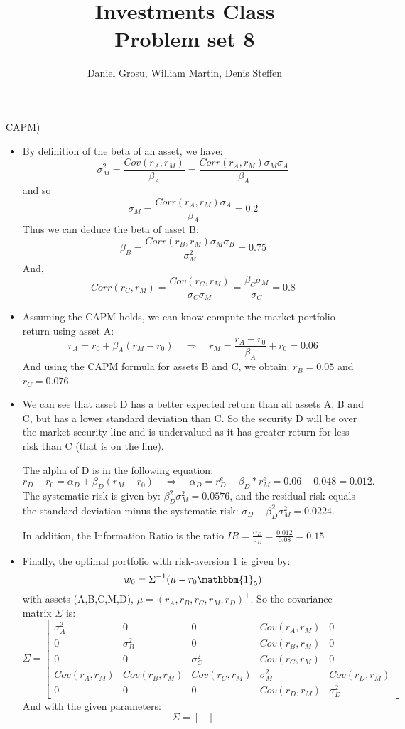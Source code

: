 \documentclass[10pt]{article}
\newenvironment{exercise}[2][Exercise]{\begin{trivlist}
  \item[\hskip \labelsep {\bfseries #1}\hskip \labelsep {\bfseries #2.}]}{\end{trivlist}}
\begin{document}
  \pagecolor{solar}
	
  \renewcommand{\qedsymbol}{\smiley}
	\title{Investments Class \\ Problem set 8}
	\author{Daniel Grosu, William Martin, Denis Steffen}
		
\maketitle

\begin{exercise}{1}(CAPM)
\end{exercise}
\begin{itemize}
  \item[(a)] By definition of the beta of an asset, we have: $$ \sigma_M^2 = \frac{Cov(r_A,r_M)}{\beta_A} = \frac{Corr(r_A,r_M)\sigma_M\sigma_A}{\beta_A}$$ and so $$ \sigma_M = \frac{Corr(r_A,r_M)\sigma_A}{\beta_A} = 0.2$$
  Thus we can deduce the beta of asset B: $$\beta_B = \frac{Corr(r_B,r_M)\sigma_M\sigma_B}{\sigma_M^2} = 0.75$$
  And, 
  $$Corr(r_C,r_M) = \frac{Cov(r_C,r_M)}{\sigma_C\sigma_M} = \frac{\beta_C\sigma_M}{\sigma_C}  = 0.8$$
  \item[(b)] Assuming the CAPM holds, we can know compute the market portfolio return using asset A: 
  $$ r_A = r_0 + \beta_A(r_M-r_0) \quad \Rightarrow \quad r_M = \frac{r_A-r_0}{\beta_A} + r_0 = 0.06$$ 
  And using the CAPM formula for assets B and C, we obtain: $ r_B = 0.05$ and $r_C = 0.076$.
  \item[(c)] We can see that asset D has a better expected return than all assets A, B and C, but has a lower standard deviation than C. So the security D will be over the market security line and is undervalued as it has greater return for less risk than C (that is on the line). 
  
  The alpha of D is in the following equation: 
  $$ r_D - r_0 = \alpha_D + \beta_D(r_M-r_0) \quad \Rightarrow \quad \alpha_D = r_D^e -\beta_D*r_M^e = 0.06 - 0.048 = 0.012.$$ 
  The systematic risk is given by: $\beta_D^2\sigma_M^2 = 0.0576$, and the residual risk equals the standard deviation minus the systematic risk: $\sigma_D-\beta_D^2\sigma_M^2 = 0.0224.$

  In addition, the Information Ratio is the ratio $IR = \frac{\alpha_D}{\sigma_D} =\frac{0.012}{0.08}= 0.15$
  \item[(d)] Finally, the optimal portfolio with risk-aversion $1$ is given by:
  $$ w_0 = \Sigma^{-1}(\mu-r_0\mathbbm{1}_5)$$ with assets (A,B,C,M,D), $\mu = (r_A,r_B,r_C,r_M,r_D)^\top$. So the covariance matrix $\Sigma$ is: 
  $$ \Sigma = \left[\begin{array}{ccccc}
    \sigma_A^2& 0 &0 &Cov(r_A,r_M)& 0\\
    0&\sigma_B^2 & 0 & Cov(r_B,r_M)&0 \\
    0&0&\sigma_C^2&Cov(r_C,r_M)&0\\
    Cov(r_A,r_M)&Cov(r_B,r_M)&Cov(r_C,r_M)&\sigma_M^2&Cov(r_D,r_M)\\
    0&0&0&Cov(r_D,r_M)&\sigma_D^2
  \end{array}\right]$$ 
  And with the given parameters: 
  $$ \Sigma = \left[\begin{array}{ccccc}
    
  \end{array}\right]$$
\end{itemize}
  
\end{document}
